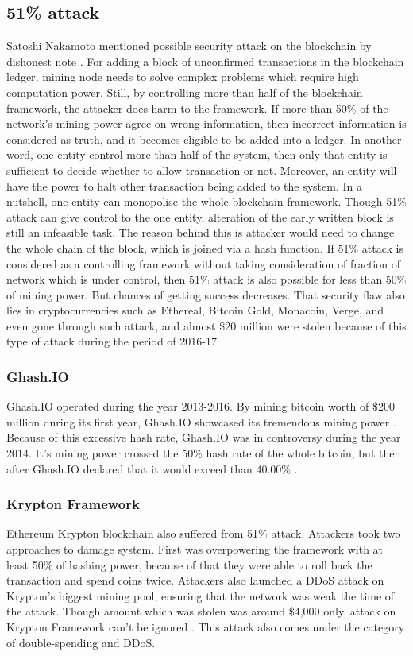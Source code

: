 \documentclass[a4paper,twoside,12pt]{report}
\begin{document}
\begin{spacing}{1.5}
\subsection{51\% attack}
\label{51attack}
Satoshi Nakamoto mentioned possible security attack on the blockchain by dishonest note \cite{satoshinakamoto}. For adding a block of unconfirmed transactions in the blockchain ledger, mining node needs to solve complex problems which require high computation power. Still, by controlling more than half of the blockchain framework, the attacker does harm to the framework. If more than 50\% of the network's mining power agree on wrong information, then incorrect information is considered as truth, and it becomes eligible to be added into a ledger. In another word, one entity control more than half of the system, then only that entity is sufficient to decide whether to allow transaction or not. Moreover, an entity will have the power to halt other transaction being added to the system. In a nutshell, one entity can monopolise the whole blockchain framework. Though 51\% attack can give control to the one entity, alteration of the early written block is still an infeasible task. The reason behind this is attacker would need to change the whole chain of the block, which is joined via a hash function. If 51\% attack is considered as a controlling framework without taking consideration of fraction of network which is under control, then 51\% attack is also possible for less than 50\% of mining power. But chances of getting success decreases. That security flaw also lies in cryptocurrencies such as Ethereal, Bitcoin Gold, Monacoin, Verge, and even gone through such attack, and almost \$20 million were stolen because of this type of attack during the period of 2016-17 \cite{topfiveblockchainsecurityissues,51attackonline}.

\subsubsection{Ghash.IO}
Ghash.IO operated during the year 2013-2016. By mining bitcoin worth of \$200 million during its first year, Ghash.IO showcased its tremendous mining power \cite{wiki:ghash.IO}. Because of this excessive hash rate, Ghash.IO was in controversy during the year 2014. It's mining power crossed the 50\% hash rate of the whole bitcoin, but then after Ghash.IO declared that it would exceed than 40.00\% \cite{wiki:ghash.IO}. 
\subsubsection{Krypton Framework}
Ethereum Krypton blockchain also suffered from 51\% attack. Attackers took two approaches to damage system. First was overpowering the framework with at least 50\% of hashing power, because of that they were able to roll back the transaction and spend coins twice. Attackers also launched a DDoS attack on Krypton's biggest mining pool, ensuring that the network was weak the time of the attack. Though amount which was stolen was around \$4,000  only, attack on Krypton Framework can't be ignored \cite{51attackonethereum}. This attack also comes under the category of double-spending and DDoS.

\end{spacing}
\end{document}
